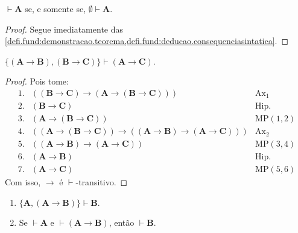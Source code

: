 \begin{corollary}
    $\vdash \mathbf{A}$ se, e somente se, $\emptyset \vdash \mathbf{A}$.
\end{corollary}

\begin{proof}
    Segue imediatamente das \cref{defi.fund:demonstracao.teorema,defi.fund:deducao.consequenciasintatica}. \blackproof
\end{proof}

\begin{example}
    $\{(\mathbf{A} \rightarrow \mathbf{B}), (\mathbf{B} \rightarrow \mathbf{C}) \} \vdash (\mathbf{A} \rightarrow \mathbf{C})$.
\end{example}

\begin{proof}
    Pois tome:
        \[
            \begin{array}{rll}
                1. & ((\mathbf{B} \rightarrow \mathbf{C}) \rightarrow (\mathbf{A} \rightarrow (\mathbf{B} \rightarrow \mathbf{C}))) & \mathrm{Ax}_1 \\
                2. & (\mathbf{B} \rightarrow \mathbf{C}) & \text{Hip.} \\
                3. & (\mathbf{A} \rightarrow (\mathbf{B} \rightarrow \mathbf{C})) & \text{MP}(1,2) \\
                4. & ((\mathbf{A} \rightarrow (\mathbf{B} \rightarrow \mathbf{C})) \rightarrow ((\mathbf{A} \rightarrow \mathbf{B}) \rightarrow (\mathbf{A} \rightarrow \mathbf{C}))) & \mathrm{Ax}_2 \\
                5. & ((\mathbf{A} \rightarrow \mathbf{B}) \rightarrow (\mathbf{A} \rightarrow \mathbf{C})) & \text{MP}(3,4) \\
                6. & (\mathbf{A} \rightarrow \mathbf{B}) & \text{Hip.} \\
                7. & (\mathbf{A} \rightarrow \mathbf{C}) & \text{MP}(5,6)
            \end{array}
        \]
    Com isso, $\rightarrow$ é $\vdash$-transitivo. \blackproof
\end{proof}

\begin{example}
    \leavevmode
        \begin{enumerate}[leftmargin=*, align=left, label=\textbf{(\alph*)}]
            \item $\{ \mathbf{A}, (\mathbf{A} \rightarrow \mathbf{B}) \} \vdash \mathbf{B}$.
            \item Se $\vdash \mathbf{A}$ e $\vdash (\mathbf{A} \rightarrow \mathbf{B})$, então $\vdash \mathbf{B}$.
        \end{enumerate}
\end{example}

